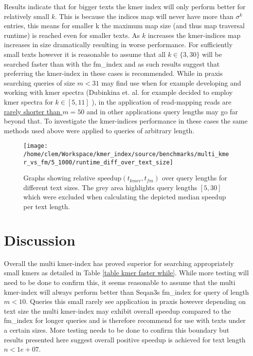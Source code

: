 Results indicate that for bigger texts the kmer index will only perform
better for relatively small $k$. This is because the indices map will never have more than
$\sigma^{k}$ entries, this means for smaller k the maximum map size (and thus map traversal runtime)
is reached even for smaller texts. As $k$ increases the kmer-indices map increases in
size dramatically resulting in worse performance.
For sufficiently small texts however it is reasonable to assume that  all $k\in\{3,30\}$ will be searched faster than
with the fm\_index and as such results suggest that preferring the kmer-index in these cases is recommended.
While in praxis searching queries of size $m<31$ may find use when for example developing and working with kmer spectra
(Dubinkina et. al. for example decided to employ kmer spectra for $k\in[5, 11]$ \cite{kmer:spectrum:dissimilarity}),
in the application of read-mapping reads are
\href{https://www.illumina.com/science/technology/next-generation-sequencing/plan-experiments/read-length.html}{rarely shorter than $m=50$}
and in other applications query lengths may go far beyond that. To investigate the kmer-indices performance in these cases
the same methods used above were applied to queries of arbitrary length. \newpage

\begin{figure}[H]
\texttt{[image: /home/clem/Workspace/kmer\_index/source/benchmarks/multi\_kmer\_vs\_fm/5\_1000/runtime\_diff\_over\_text\_size]}\caption{\label{figure 5_100}
Graphs showing relative $\text{speedup}(t_{kmer},t_{fm})$ over
query lengths for different text sizes. The grey area highlights query
lengths $[5, 30]$ which were excluded when calculating the depicted median speedup per text length.}
\end{figure}

\section{Discussion}
Overall the multi kmer-index has proved superior for searching appropriately small kmers as detailed in Table
\ref{table kmer faster while}. While more testing will need to be done to confirm this, it seems reasonable to assume
that the multi kmer-index will always perform better than Seqan3s fm\_index for query of length $m<10$. Queries this small
rarely see application in praxis however depending on text size the multi kmer-index may
exhibit overall speedup compared to the fm\_index for longer queries and is therefore recommend for use with texts
under a certain sizes. More testing needs to be done to confirm this boundary but results presented here suggest
overall positive speedup is achieved for text length $n<1e+07$.


